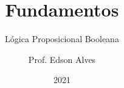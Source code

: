 \title{Fundamentos}
\subtitle{Lógica Proposicional Booleana}
\date{2021}
\author{Prof. Edson Alves}
